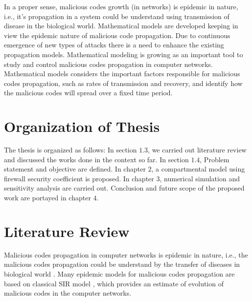 In a proper sense, malicious codes growth (in networks) is epidemic in nature, i.e., it's propagation in a system could be understand using transmission of disease in the biological world. Mathematical models are developed keeping in view the epidemic nature of malicious code propagation. Due to continuous emergence of new types of attacks there is a need to enhance the existing propagation models. Mathematical modeling is growing as an important tool to  study and control malicious codes propagation in computer networks. Mathematical models considers the important factors responsible for malicious codes propagation, such as rates of transmission and recovery, and identify how the malicious codes will spread over a fixed time period.

\section{Organization of Thesis}
The thesis is organized as follows: In section $1.3$,  we carried out literature review and discussed the works done in the context so far. In section $1.4$, Problem statement and objective are defined. In chapter $2$, a compartmental model using firewall security coefficient is proposed. In chapter $3$, numerical simulation and sensitivity analysis are carried out. Conclusion and future scope of the proposed work are portayed in chapter $4$.

\section{Literature Review}
Malicious codes propagation in computer networks is epidemic in nature, i.e., the malicious codes propagation could be understand by the transfer of diseases in biological world \cite{sahu2012,kephart1993computers,molen2011math}. Many epidemic models for malicious codes propagation are based on classical SIR model \cite{kermack1927contribution,kermack1932contributions,kermack1933contributions}, which provides an estimate of evolution of malicious codes in the computer networks.


